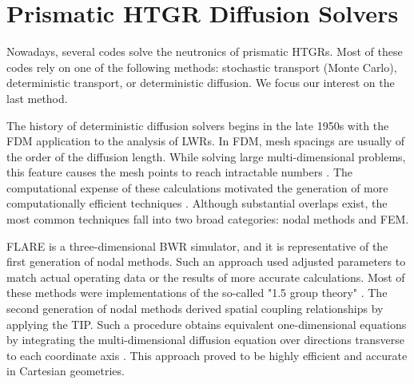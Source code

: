 \section{Prismatic HTGR Diffusion Solvers}

Nowadays, several codes solve the neutronics of prismatic \glspl{HTGR}.
Most of these codes rely on one of the following methods: stochastic transport (Monte Carlo), deterministic transport, or deterministic diffusion.
We focus our interest on the last method.

The history of deterministic diffusion solvers begins in the late 1950s with the \gls{FDM} application to the analysis of \glspl{LWR}.
In \gls{FDM}, mesh spacings are usually of the order of the diffusion length.
While solving large multi-dimensional problems, this feature causes the mesh points to reach intractable numbers \cite{lewis_finite_1986}.
The computational expense of these calculations motivated the generation of more computationally efficient techniques \cite{lawrence_progress_1986}.
Although substantial overlaps exist, the most common techniques fall into two broad categories: nodal methods and \gls{FEM}.

FLARE \cite{delp_flare_1964} is a three-dimensional \gls{BWR} simulator, and it is representative of the first generation of nodal methods.
Such an approach used adjusted parameters to match actual operating data or the results of more accurate calculations.
Most of these methods were implementations of the so-called "1.5 group theory" \cite{gupta_nodal_1981}.
The second generation of nodal methods derived spatial coupling relationships by applying the \gls{TIP}.
Such a procedure obtains equivalent one-dimensional equations by integrating the multi-dimensional diffusion equation over directions transverse to each coordinate axis \cite{lawrence_progress_1986}.
This approach proved to be highly efficient and accurate in Cartesian geometries.

